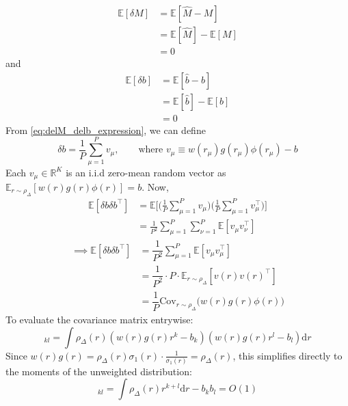 \documentclass[11pt,a4paper]{article}
\theoremstyle{remark}
\newcommand{\E}{\mathbb{E}}
\newcommand{\rmd}{\textrm{d}}
\newcommand{\del}{\delta}
\begin{document}
\begin{onehalfspace}
\begin{align} 
    \E[\del M] &= \E[\hat{M}- M] \nonumber\\
                         &= \E[\hat{M}] - \E[M] \nonumber\\
                         &= 0 \label{mean_delM} 
\end{align}
and
\begin{align}
    \E[\del b] & = \E[\hat{b} - b] \nonumber\\
                        & = \E[\hat{b}] - \E[b] \nonumber\\
                        & = 0 \label{mean_delb}
\end{align}           
From \eqref{eq:delM_delb_expression}, we can define
\begin{equation}
    \del b = \frac{1}{P}\sum_{\mu=1}^{P}v_\mu, \qquad\text{where } v_\mu \equiv w(r_\mu)g(r_\mu)\phi(r_\mu)-b
\end{equation}
Each $v_\mu \in \mathbb{R}^K$ is an i.i.d zero-mean random vector as $\E_{r\sim\rho_\Delta}[w(r)g(r)\phi(r)]=b$.
Now,
\begin{align}
    \E[\del b\del b^{\top}] &= \E\Bigg[ \Bigg( \frac{1}{P}\sum_{\mu=1}^{P}v_\mu\Bigg)\Bigg( \frac{1}{P}\sum_{\mu=1}^{P}v_\mu^{\top}\Bigg)\Bigg] \nonumber \\
                                &= \frac{1}{P^2}\sum_{\mu=1}^{P}\sum_{\nu=1}^{P}\E[v_\mu v_\nu^\top]
\end{align}
\begin{align}
    \implies \E[\del b\del b^{\top}] &= \dfrac{1}{P^2}\sum_{\mu=1}^{P}\E[v_\mu v_\mu^{\top}]\nonumber \\
                                    &= \dfrac{1}{P^2}\cdot P\cdot \E_{r\sim\rho_\Delta}[v(r)v(r)^{\top}]\nonumber \\
                                    &= \dfrac{1}{P}\text{Cov}_{r\sim\rho_\Delta}\big(w(r)g(r)\phi(r) \big)
\end{align}
To evaluate the covariance matrix entrywise:
\begin{equation}
    [\text{Cov}_{r\sim\rho_{\Delta}}]_{kl} = \int \rho_\Delta(r) (w(r)g(r)r^k - b_k)(w(r)g(r)r^l - b_l)\rmd r
\end{equation}
Since $w(r)g(r) = \rho_\Delta(r)\sigma_1(r)\cdot\frac{1}{\sigma_1(r)} = \rho_\Delta(r)$, this simplifies directly to the moments of the unweighted distribution:
\begin{equation}
    [\text{Cov}_{r\sim\rho_\Delta}\big( w(r)g(r)\phi(r)\big)]_{kl} = \int \rho_\Delta(r)r^{k+l}\rmd r- b_kb_l = O(1)

\end{equation}
\end{onehalfspace}
\end{document}
